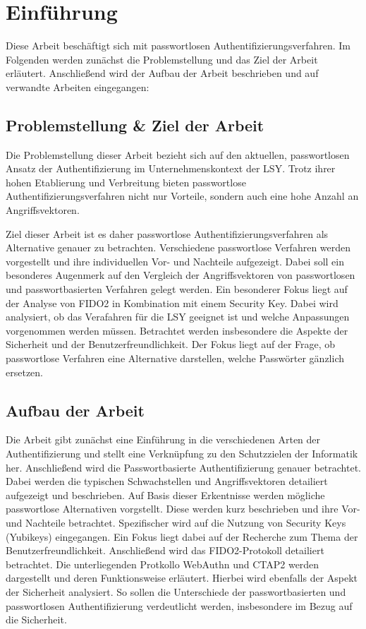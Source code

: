\chapter{Einführung}
Diese Arbeit beschäftigt sich mit passwortlosen Authentifizierungsverfahren. Im Folgenden werden zunächst die Problemstellung und das Ziel der Arbeit erläutert. Anschließend wird der Aufbau der Arbeit beschrieben und auf verwandte Arbeiten eingegangen:

\section{Problemstellung \& Ziel der Arbeit} \label{target}
Die Problemstellung dieser Arbeit bezieht sich auf den aktuellen, passwortlosen Ansatz der Authentifizierung im Unternehmenskontext der \ac{LSY}. Trotz ihrer hohen Etablierung und Verbreitung bieten passwortlose Authentifizierungsverfahren nicht nur Vorteile, sondern auch eine hohe Anzahl an Angriffsvektoren. 

Ziel dieser Arbeit ist es daher passwortlose Authentifizierungsverfahren als Alternative genauer zu betrachten. Verschiedene passwortlose Verfahren werden vorgestellt und ihre individuellen Vor- und Nachteile aufgezeigt. Dabei soll ein besonderes Augenmerk auf den Vergleich der Angriffsvektoren von passwortlosen und passwortbasierten Verfahren gelegt werden. Ein besonderer Fokus liegt auf der Analyse von FIDO2 in Kombination mit einem Security Key. Dabei wird analysiert, ob das Verafahren für die \ac{LSY} geeignet ist und welche Anpassungen vorgenommen werden müssen. Betrachtet werden insbesondere die Aspekte der Sicherheit und der Benutzerfreundlichkeit. Der Fokus liegt auf der Frage, ob passwortlose Verfahren eine Alternative darstellen, welche Passwörter gänzlich ersetzen. 

\section{Aufbau der Arbeit}
Die Arbeit gibt zunächst eine Einführung in die verschiedenen Arten der Authentifizierung und stellt eine Verknüpfung zu den Schutzzielen der Informatik her. Anschließend wird die Passwortbasierte Authentifizierung genauer betrachtet. Dabei werden die typischen Schwachstellen und Angriffsvektoren detailiert aufgezeigt und beschrieben. Auf Basis dieser Erkentnisse werden mögliche passwortlose Alternativen vorgstellt. Diese werden kurz beschrieben und ihre Vor- und Nachteile betrachtet. Spezifischer wird auf die Nutzung von Security Keys (Yubikeys) eingegangen. Ein Fokus liegt dabei auf der Recherche zum Thema der Benutzerfreundlichkeit. Anschließend wird das FIDO2-Protokoll detailiert betrachtet. Die unterliegenden Protkollo WebAuthn und CTAP2 werden dargestellt und deren Funktionsweise erläutert. Hierbei wird ebenfalls der Aspekt der Sicherheit analysiert. So sollen die Unterschiede der passwortbasierten und passwortlosen Authentifizierung verdeutlicht werden, insbesondere im Bezug auf die Sicherheit.

